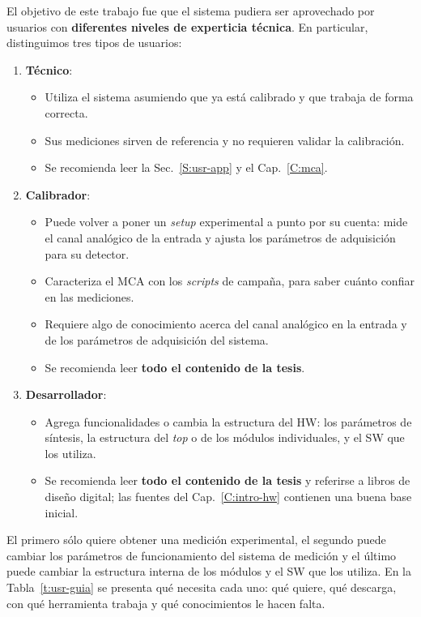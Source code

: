 El objetivo de este trabajo fue que el sistema pudiera ser aprovechado por
usuarios con \textbf{diferentes niveles de experticia técnica}. En particular,
distinguimos tres tipos de usuarios:
\begin{enumerate}
  \item \textbf{Técnico}:
  \begin{itemize}
    \item Utiliza el sistema asumiendo que ya está calibrado y que trabaja de
      forma correcta.
    \item Sus mediciones sirven de referencia y no requieren validar la
      calibración.
    \item Se recomienda leer la Sec.~\ref{S:usr-app} y el Cap.~\ref{C:mca}.
  \end{itemize}
  \item \textbf{Calibrador}:
  \begin{itemize}
    \item Puede volver a poner un \emph{setup} experimental a punto por su cuenta: mide
      el canal analógico de la entrada y ajusta los parámetros de adquisición
      para su detector.
    \item Caracteriza el MCA con los \emph{scripts} de campaña, para saber cuánto
      confiar en las mediciones.
    \item Requiere algo de conocimiento acerca del canal analógico en la entrada
      y de los parámetros de adquisición del sistema.
    \item Se recomienda leer \textbf{todo el contenido de la tesis}.
  \end{itemize}
  \item \textbf{Desarrollador}:
  \begin{itemize}
    \item Agrega funcionalidades o cambia la estructura del HW: los parámetros de
      síntesis, la estructura del \emph{top} o de los módulos individuales, y el SW que
      los utiliza.
    \item Se recomienda leer \textbf{todo el contenido de la tesis} y referirse
      a libros de diseño digital; las fuentes del Cap.~\ref{C:intro-hw}
      contienen una buena base inicial.
  \end{itemize}
\end{enumerate}

El primero sólo quiere obtener una medición experimental, el segundo puede
cambiar los parámetros de funcionamiento del sistema de medición y el último
puede cambiar la estructura interna de los módulos y el SW que los utiliza. En la
Tabla~\ref{t:usr-guia} se presenta qué necesita cada uno: qué quiere, qué
descarga, con qué herramienta trabaja y qué conocimientos le hacen falta.

